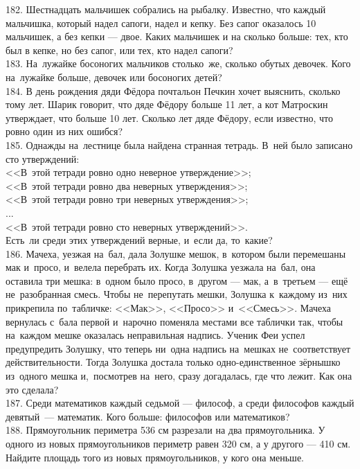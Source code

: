 182. Шестнадцать мальчишек собрались на рыбалку. Известно, что каждый мальчишка, который надел сапоги, надел и кепку. Без сапог оказалось 10 мальчишек, а без кепки --- двое. Каких мальчишек и на сколько больше: тех, кто был в кепке, но без сапог, или тех, кто надел сапоги?\\
183. На лужайке босоногих мальчиков столько же, сколько обутых девочек. Кого на лужайке больше, девочек или босоногих детей?\\
184. В день рождения дяди Фёдора почтальон Печкин хочет выяснить, сколько тому лет. Шарик говорит, что дяде Фёдору больше 11 лет, а кот Матроскин утверждает, что больше 10 лет. Сколько лет дяде Фёдору, если известно, что ровно один из них ошибся?\\
185. Однажды на лестнице была найдена странная тетрадь. В ней было записано сто утверждений:\\
<<В этой тетради ровно одно неверное утверждение>>;\\
<<В этой тетради ровно два неверных утверждения>>;\\
<<В этой тетради ровно три неверных утверждения>>;\\
...\\
<<В этой тетради ровно сто неверных утверждений>>.\\
Есть ли среди этих утверждений верные, и если да, то какие?\\
186. Мачеха, уезжая на бал, дала Золушке мешок, в котором были перемешаны мак и просо, и велела перебрать их. Когда Золушка уезжала на бал, она оставила три мешка: в одном было просо, в другом --- мак, а в третьем --- ещё не разобранная смесь. Чтобы не перепутать мешки, Золушка к каждому из них прикрепила по табличке: <<Мак>>, <<Просо>> и <<Смесь>>. Мачеха вернулась с бала первой и нарочно поменяла местами все таблички так, чтобы на каждом мешке оказалась неправильная надпись. Ученик Феи успел предупредить Золушку, что теперь ни одна надпись на мешках не соответствует действительности. Тогда Золушка достала только одно-единственное зёрнышко из одного мешка и, посмотрев на него, сразу догадалась, где что лежит. Как она это сделала?\\
187. Среди математиков каждый седьмой --- философ, а среди философов каждый девятый --- математик. Кого больше: философов или математиков?\\
188. Прямоугольник периметра 536 см разрезали на два прямоугольника. У одного из новых прямоугольников периметр равен 320 см, а у другого --- 410 см. Найдите площадь того из новых прямоугольников, у кого она меньше.\\
